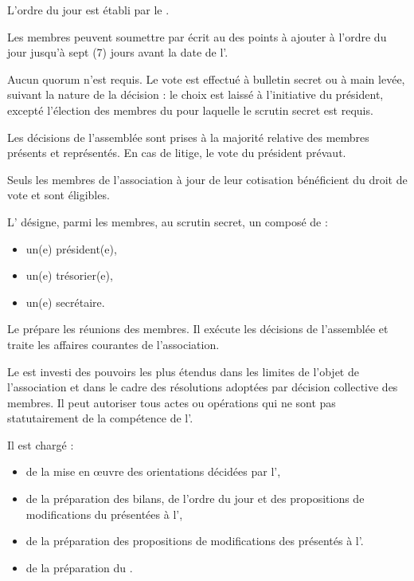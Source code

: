 \label{sec:ag}
L'ordre du jour est établi par le \bureau{}. %

Les membres peuvent soumettre par écrit au \bureau{} des points à ajouter à l'ordre du jour jusqu'à sept (7) jours avant la date de l'\AG{}.


Aucun quorum n'est requis. Le vote est effectué à bulletin secret ou à
main levée, suivant la nature de la décision : le choix est laissé à
l'initiative du président, excepté l'élection des membres du \bureau{}
pour laquelle le scrutin secret est requis.

Les décisions de l'assemblée sont prises à la majorité relative des
membres présents et représentés. En cas de litige, le vote du
président prévaut.

Seuls les membres de l'association à jour de leur cotisation
bénéficient du droit de vote et sont éligibles.





\label{sec:bureau}
L'\AG{} désigne, parmi les membres, au scrutin secret, un
\bureau{} composé de :
\begin{itemize}
\item un(e) président(e),
  
\item un(e) trésorier(e),

\item un(e) secrétaire.
\end{itemize}

Le \bureau{} prépare les réunions des membres. Il exécute les décisions de l'assemblée et traite les affaires courantes de l'association.

\label{sec:pouvoirs}
Le \bureau{} est investi des pouvoirs les plus étendus dans les limites
de l'objet de l'association et dans le cadre des résolutions adoptées
par décision collective des membres. Il peut autoriser tous actes ou
opérations qui ne sont pas statutairement de la compétence de
l'\AG{}.

Il est chargé :
\begin{itemize}
\item de la mise en \oe{}uvre des orientations décidées par l'\AG{},

  \item de la préparation des bilans, de l'ordre du jour et des
  propositions de modifications du \RI{} présentées à
  l'\AG{},

  \item de la préparation des propositions de modifications des \statuts{}
  présentés à l'\AGE{}.

  \item de la préparation du \RI{}.

  
\end{itemize}



